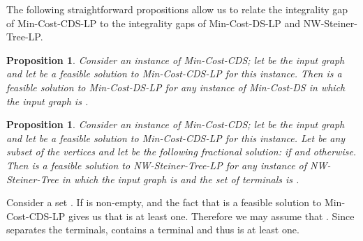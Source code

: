 \documentclass[11pt]{article}
\newtheorem{prop}[lemma]{Proposition}
\renewenvironment{proof}{\vspace{-0.1in}\noindent{\bf Proof:}}{\hspace*{\fill}\par}
\def\prob#1{\textsf{\textup{#1}}\xspace}
\def\minDSlp{\prob{\minDS-LP}}
\def\minCDSlp{\prob{\minCDS-LP}}
\def\nwST{\prob{NW-Steiner-Tree}}
\def\nwSTlp{\prob{\nwST-LP}}
\def\minCDS{\prob{Min-Cost-CDS}}
\def\minDS{\prob{Min-Cost-DS}}
\begin{document}
\begin{center}
\begin{boxedminipage}{0.45\textwidth}
\vspace{-0.15in}

\end{boxedminipage}
\begin{boxedminipage}{0.45\textwidth}
\vspace{-0.15in}

\end{boxedminipage}
\end{center}

\noindent
The following straightforward propositions allow us to relate the
integrality gap of \minCDSlp to the integrality gaps of \minDSlp and
\nwSTlp.

\begin{prop} \label{prop:feasible-dominating-set}
	Consider an instance of \minCDS; let  be the input graph and
	let  be a feasible solution to \minCDSlp for this instance.
	Then  is a feasible solution to \minDSlp for any instance of
	\minDS in which the input graph is .
\end{prop}

\begin{prop} \label{prop:feasible-steiner-tree}
	Consider an instance of \minCDS; let  be the input graph and
	let  be a feasible solution to \minCDSlp for this instance.
	Let  be any subset of the vertices and let  be the
	following fractional solution:  if  and
	 otherwise. Then  is a feasible solution to
	\nwSTlp for any instance of \nwST in which the input graph is 
	and the set of terminals is .
\end{prop}
\begin{proof}
	Consider a set . If  is
	non-empty,  and the fact that  is a feasible
	solution to \minCDSlp gives us that  is at least
	one. Therefore we may assume that . Since
	 separates the terminals,  contains a terminal and
	thus  is at least one.
\end{proof}
\end{document}
